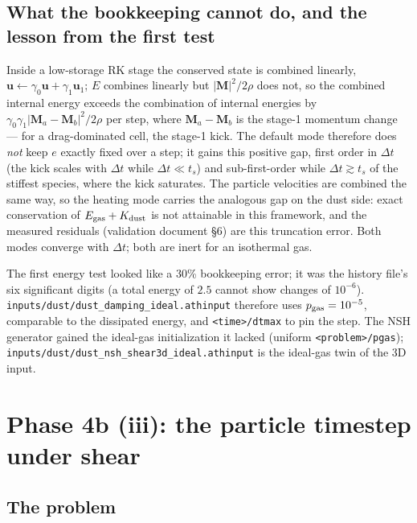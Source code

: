 \documentclass[11pt]{article}
\newcommand{\code}[1]{\texttt{#1}}
\newcommand{\file}[1]{\texttt{\small #1}}
\begin{document}
\subsection{What the bookkeeping cannot do, and the lesson from the first test}

Inside a low-storage RK stage the conserved state is combined linearly,
$\mathbf u \leftarrow \gamma_0\mathbf u + \gamma_1\mathbf u_1$; $E$ combines linearly
but $|\mathbf M|^2/2\rho$ does not, so the combined internal energy exceeds the
combination of internal energies by $\gamma_0\gamma_1|\mathbf M_a - \mathbf M_b|^2/2\rho$
per step, where $\mathbf M_a - \mathbf M_b$ is the stage-1 momentum change --- for a
drag-dominated cell, the stage-1 kick. The default mode therefore does \emph{not} keep
$e$ exactly fixed over a step; it gains this positive gap, first order in $\Delta t$
(the kick scales with $\Delta t$ while $\Delta t \ll t_s$) and sub-first-order while
$\Delta t \gtrsim t_s$ of the stiffest species, where the kick saturates. The particle
velocities are combined the same way, so the heating mode carries the analogous gap on
the dust side: exact conservation of $E_{\rm gas} + K_{\rm dust}$ is not attainable in
this framework, and the measured residuals (validation document \S6) are this
truncation error. Both modes converge with $\Delta t$; both are inert for an
isothermal gas.

The first energy test looked like a 30\% bookkeeping error; it was the history file's
six significant digits (a total energy of $2.5$ cannot show changes of $10^{-6}$).
\file{inputs/dust/dust\_damping\_ideal.athinput} therefore uses $p_{\rm gas} = 10^{-5}$,
comparable to the dissipated energy, and \code{<time>/dtmax} to pin the step. The NSH
generator gained the ideal-gas initialization it lacked (uniform \code{<problem>/pgas});
\file{inputs/dust/dust\_nsh\_shear3d\_ideal.athinput} is the ideal-gas twin of the 3D
input.

\section{Phase 4b (iii): the particle timestep under shear}
\label{sec:phase4b3}

\subsection{The problem}
\end{document}

